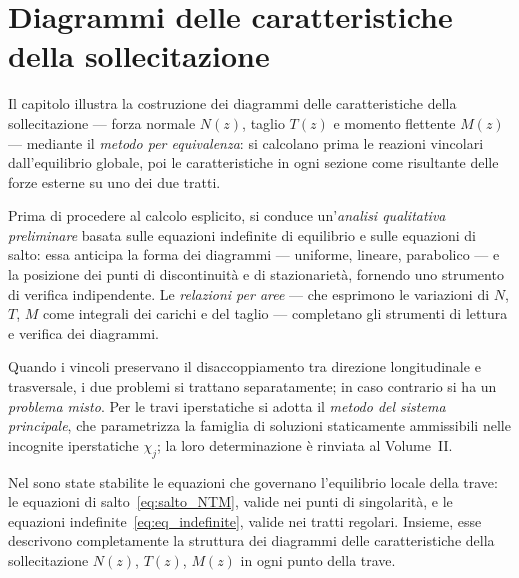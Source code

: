 \graphicspath{{Parti/P04-Travi_rigide/C02_Diagrammi_delle_CS_trave_singola/Figure/}}
\chapter{Diagrammi delle caratteristiche della sollecitazione}\label{cap:Diagrammi_CS}

\begin{sommario}
	Il capitolo illustra la costruzione dei diagrammi
	delle caratteristiche della sollecitazione ---
	forza normale $N(z)$, taglio $T(z)$ e momento
	flettente $M(z)$ --- mediante il \emph{metodo
		per equivalenza}: si calcolano prima le reazioni
	vincolari dall'equilibrio globale, poi le
	caratteristiche in ogni sezione come risultante
	delle forze esterne su uno dei due tratti.
	
	Prima di procedere al calcolo esplicito, si
	conduce un'\emph{analisi qualitativa preliminare}
	basata sulle equazioni indefinite di equilibrio
	e sulle equazioni di salto: essa anticipa la
	forma dei diagrammi --- uniforme, lineare,
	parabolico --- e la posizione dei punti di
	discontinuità e di stazionarietà, fornendo
	uno strumento di verifica indipendente.
	Le \emph{relazioni per aree} --- che esprimono
	le variazioni di $N$, $T$, $M$ come integrali
	dei carichi e del taglio --- completano gli
	strumenti di lettura e verifica dei diagrammi.
	
	Quando i vincoli preservano il disaccoppiamento
	tra direzione longitudinale e trasversale, i due
	problemi si trattano separatamente; in caso
	contrario si ha un \emph{problema misto}.
	Per le travi iperstatiche si adotta il
	\emph{metodo del sistema principale}, che
	parametrizza la famiglia di soluzioni
	staticamente ammissibili nelle incognite
	iperstatiche $\chi_j$; la loro determinazione
	è rinviata al Volume~II.
\end{sommario}




Nel  sono state stabilite
le equazioni che governano l'equilibrio locale della
trave: le equazioni di salto~\eqref{eq:salto_NTM},
valide nei punti di singolarità, e le equazioni
indefinite~\eqref{eq:eq_indefinite}, valide nei
tratti regolari. Insieme, esse descrivono
completamente la struttura dei diagrammi delle
caratteristiche della sollecitazione $N(z)$,
$T(z)$, $M(z)$ in ogni punto della trave.

